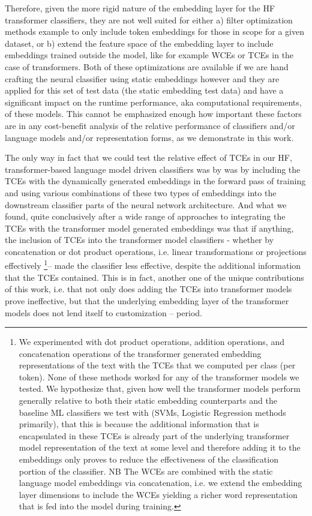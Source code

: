 \documentclass[final]{clv2025}
\begin{document}
Therefore, given the more rigid nature of the embedding layer for the HF transformer classifiers, they are not well suited for either a) filter optimization methods example to only include token embeddings for those in scope for a given dataset, or b) extend the feature space of the embedding layer to include embeddings trained outside the model, like for example WCEs or TCEs in the case of transformers. Both of these optimizations are available if we are hand crafting the neural classifier using static embeddings however and they are applied for this set of test data (the static embedding test data) and have a significant impact on the runtime performance, aka computational requirements, of these models. This cannot be emphasized enough how important these factors are in any cost-benefit analysis of the relative performance of classifiers and/or language models and/or representation forms, as we demonstrate in this work.

The only way in fact that we could test the relative effect of TCEs in our HF, transformer-based language model driven classifiers was by was by including the TCEs with the dynamically generated embeddings in the forward pass of training and using various combinations of these two types of embeddings into the downstream classifier parts of the neural network architecture. And what we found, quite conclusively after a wide range of approaches to integrating the TCEs with the transformer model generated embeddings was that if anything, the inclusion of TCEs into the transformer model classifiers - whether by concatenation or dot product operations, i.e. linear transformations or projections effectively \footnote{We experimented with dot product operations, addition operations, and concatenation operations of the transformer generated embedding representations of the text with the TCEs that we computed per class (per token). None of these methods worked for any of the transformer models we tested. We hypothesize that, given how well the transformer models perform generally relative to both their static embedding counterparts and the baseline ML classifiers we test with (SVMs, Logistic Regression methods primarily), that this is because the additional information that is encapsulated in these TCEs is already part of the underlying transformer model representation of the text at some level and therefore adding it to the embeddings only proves to reduce the effectiveness of the classification portion of the classifier. NB The WCEs are combined with the static language model embeddings via concatenation, i.e. we extend the embedding layer dimensions to include the WCEs yielding a richer word representation that is fed into the model during training.}– made the classifier less effective, despite the additional information that the TCEs contained. This is in fact, another one of the unique contributions of this work, i.e. that not only does adding the TCEs into transformer models prove ineffective, but that the underlying embedding layer of the transformer models does not lend itself to customization – period.
\end{document}

